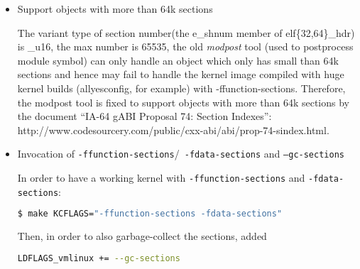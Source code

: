 \documentclass[10pt,a4paper]{article}
\begin{document}
\begin{multicols}{2}
\begin{itemize}
A better pattern may be the following:

\begin{lstlisting}[language=c,
                  commentstyle=\fontsize{7}{8}\selectfont,
                  basicstyle=\ttfamily\fontsize{7}{8}\selectfont]
*(.text.[^.]*)
\end{lstlisting}

Note, both of the above patterns are only supported by the latest {\em ld}, please
use the versions newer than 2.21.0.20110327 or else, they don't work and will
on the contrary to generate bigger kernel image for ever such section will be
linked to its own section in the last executable and the size will be increased
heavily for the required alignment of every section.

\item Support objects with more than 64k sections

The variant type of section number(the e\_shnum member of elf\{32,64\}\_hdr) is
\_u16, the max number is 65535, the old {\em modpost} tool (used to postprocess
module symbol) can only handle an object which only has small than 64k sections
and hence may fail to handle the kernel image compiled with huge kernel builds
(allyesconfig, for example) with -ffunction-sections. Therefore, the modpost
tool is fixed to support objects with more than 64k sections by the document
``IA-64 gABI Proposal 74: Section Indexes'':
http://www.codesourcery.com/public/cxx-abi/abi/prop-74-sindex.html.

\item Invocation of {\small {\tt -ffunction-sections}}/{\small {\tt
	-fdata-sections}} and {\small {\tt --gc-sections}}

In order to have a working kernel with {\small {\tt -ffunction-sections}} and
{\small {\tt -fdata-sections}}:

\begin{lstlisting}[language=bash,
                  commentstyle=\fontsize{7}{8}\selectfont,
                  basicstyle=\ttfamily\fontsize{7}{8}\selectfont]
$ make KCFLAGS="-ffunction-sections -fdata-sections"
\end{lstlisting}

Then, in order to also garbage-collect the sections, added

\begin{lstlisting}[language=bash,
                  commentstyle=\fontsize{7}{8}\selectfont,
                  basicstyle=\ttfamily\fontsize{7}{8}\selectfont]
LDFLAGS_vmlinux += --gc-sections
\end{lstlisting}


\end{itemize}
\end{multicols}
\end{document}
